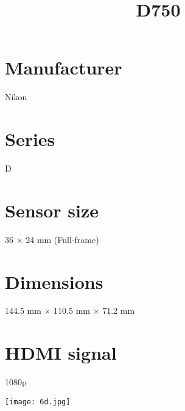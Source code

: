 \documentclass{article}
\begin{document}
\usepackage{titlesec}
\usepackage{graphicx}


\title{D750}
\section{Manufacturer}
Nikon
\section{Series}
D
\section{Sensor size}
36 × 24 mm (Full-frame)
\section{Dimensions}
144.5 mm × 110.5 mm × 71.2 mm
\section{HDMI signal}
1080p


\texttt{[image: 6d.jpg]}
\end{document}
